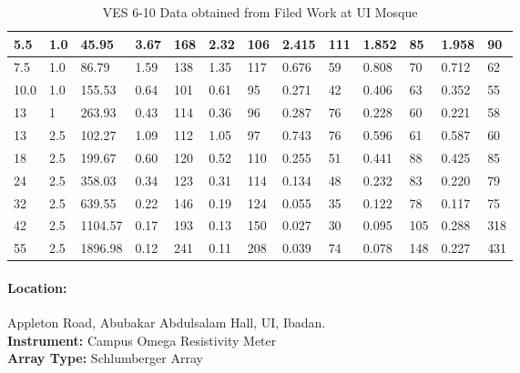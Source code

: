 \documentclass[12pt,a4paper]{report}
\begin{document}
\begin{table}[h!]
\begin{adjustbox}{max width=\textwidth}
\begin{tabular}{|p{2.5cm}|p{2.5cm}|p{2.5cm}|p{1.5cm}|p{1.8cm}|p{1.5cm}|p{1.8cm}|p{1.5cm}|p{1.8cm}|p{1.5cm}|p{1.8cm}|p{1.5cm}|p{1.8cm}|}
    5.5 & 1.0 & 45.95 & 3.67 & 168 & 2.32 & 106 & 2.415 & 111 & 1.852 & 85 & 1.958 & 90 \\ \hline
    7.5 & 1.0 & 86.79 & 1.59 & 138 & 1.35 & 117 & 0.676 & 59 & 0.808 & 70 & 0.712 & 62 \\ \hline
    10.0 & 1.0 & 155.53 & 0.64 & 101 & 0.61 & 95 & 0.271 & 42 & 0.406 & 63 & 0.352 & 55 \\ \hline
    13 & 1 & 263.93 & 0.43 & 114 & 0.36 & 96 & 0.287 & 76 & 0.228 & 60 & 0.221 & 58 \\ \hline
    13 & 2.5 & 102.27 & 1.09 & 112 & 1.05 & 97 & 0.743 & 76 & 0.596 & 61 & 0.587 & 60 \\ \hline
    18 & 2.5 & 199.67 & 0.60 & 120 & 0.52 & 110 & 0.255 & 51 & 0.441 & 88 & 0.425 & 85 \\ \hline
    24 & 2.5 & 358.03 & 0.34 & 123 & 0.31 & 114 & 0.134 & 48 & 0.232 & 83 & 0.220 & 79 \\ \hline
    32 & 2.5 & 639.55 & 0.22 & 146 & 0.19 & 124 & 0.055 & 35 & 0.122 & 78 & 0.117 & 75 \\ \hline
    42 & 2.5 & 1104.57 & 0.17 & 193 & 0.13 & 150 & 0.027 & 30 & 0.095 & 105 & 0.288 & 318 \\ \hline
    55 & 2.5 & 1896.98 & 0.12 & 241 & 0.11 & 208 & 0.039 & 74 & 0.078 & 148 & 0.227 & 431 \\ \hline
    \end{tabular}
    \end{adjustbox}
    \caption{VES 6-10 Data obtained from Filed Work at UI Mosque}
    \label{tab:ui_ves-6-10}
\end{table}

\paragraph{\textbf{Location:}} {Appleton Road, Abubakar Abdulsalam Hall, UI, Ibadan.} \\
\textbf{Instrument:} {Campus Omega Resistivity Meter} \\
\textbf{Array Type:} {Schlumberger Array }
\end{document}
